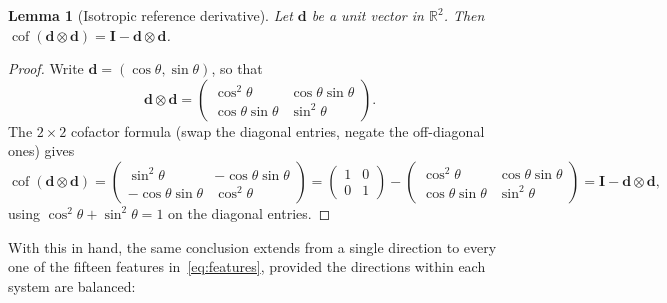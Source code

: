 \documentclass[10pt,a4paper]{article}
\newtheorem{lemma}{Lemma}
\newcommand{\Cof}{\operatorname{cof}}
\newcommand{\R}{\mathbb{R}}
\begin{document}
\begin{lemma}[Isotropic reference derivative]
\label{lem:isotropic}
Let $\bm d$ be a unit vector in $\R^2$.  Then $\Cof(\bm d\otimes\bm d)=\bm I-\bm d\otimes\bm d$.
\end{lemma}
\begin{proof}
Write $\bm d=(\cos\theta,\sin\theta)$, so that
\begin{equation}
 \bm d\otimes\bm d=
 \begin{pmatrix}\cos^2\theta&\cos\theta\sin\theta\\[2pt]
 \cos\theta\sin\theta&\sin^2\theta\end{pmatrix}.
\end{equation}
The $2\times2$ cofactor formula (swap the diagonal entries, negate the
off-diagonal ones) gives
\begin{equation}
 \Cof(\bm d\otimes\bm d)=
 \begin{pmatrix}\sin^2\theta&-\cos\theta\sin\theta\\[2pt]
 -\cos\theta\sin\theta&\cos^2\theta\end{pmatrix}
 =\begin{pmatrix}1&0\\0&1\end{pmatrix}
 -\begin{pmatrix}\cos^2\theta&\cos\theta\sin\theta\\[2pt]
 \cos\theta\sin\theta&\sin^2\theta\end{pmatrix}
 =\bm I-\bm d\otimes\bm d,
\end{equation}
using $\cos^2\theta+\sin^2\theta=1$ on the diagonal entries.
\end{proof}

With this in hand, the same conclusion extends from a single direction
to every one of the fifteen features in~\eqref{eq:features}, provided
the directions within each system are balanced:
\end{document}
